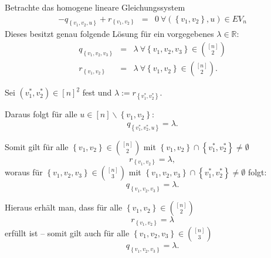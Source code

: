 \documentclass[10p,a4paper,BCOR = 12mm, DIV=15]{scrbook}
\begin{document}
\begin{Le}
\label{le:loesung_transponiert_nsymmxy}
Betrachte das homogene lineare Gleichungssystem
\begin{eqnarray*}
-q_{\left\{v_1, v_2, u\right\}} + r_{\left\{v_1, v_2\right\}} & = &  0\ \forall \left(\left\{v_1, v_2\right\}, u\right)\in EV_n
\end{eqnarray*}
Dieses besitzt genau folgende Lösung für ein vorgegebenes $\lambda\in \mathbb{R}$:
\begin{eqnarray*}
q_{\left\{v_1, v_2, v_3\right\}} & = & \lambda \ \forall \left\{v_1, v_2, v_3\right\} \in {\left[n\right] \choose 2} \\
r_{\left\{v_1, v_2\right\}} & = & \lambda \ \forall \left\{v_1, v_2\right\}\in {\left[n\right] \choose 2}.
\end{eqnarray*}
\end{Le}
\begin{bew}
Sei $\left(v_1^*, v_2^*\right) \in \left[n\right]^{\underline{2}}$ fest und $\lambda := r_{\left\{v_1^*, v_2^*\right\}}$.

Daraus folgt für alle $u \in \left[n\right] \backslash \left\{v_1, v_2\right\}$:
\begin{displaymath}
q_{\left\{v_1^*, v_2^*, u\right\}} = \lambda.
\end{displaymath}

Somit gilt für alle $\left\{v_1, v_2\right\} \in {\left[n\right] \choose 2}$ mit $\left\{v_1, v_2\right\} \cap \left\{v_1^*, v_2^*\right\} \neq \emptyset$
\begin{displaymath}
r_{\left\{v_1, v_2\right\}} = \lambda,
\end{displaymath}
woraus für $\left\{v_1, v_2, v_3\right\} \in {\left[n\right] \choose 3}$ mit $\left\{v_1, v_2, v_3\right\} \cap \left\{v_1^*, v_2^*\right\} \neq \emptyset$ folgt:
\begin{displaymath}
q_{\left\{v_1, v_2, v_3\right\}} = \lambda.
\end{displaymath}

Hieraus erhält man, dass für alle $\left\{v_1, v_2\right\} \in {\left[n\right] \choose 2}$
\begin{displaymath}
r_{\left\{v_1, v_2\right\}} = \lambda
\end{displaymath}
erfüllt ist -- somit gilt auch für alle $\left\{v_1, v_2, v_3\right\} \in {\left[n\right] \choose 3}$
\begin{displaymath}
q_{\left\{v_1, v_2, v_3\right\}} = \lambda.
\end{displaymath}
\end{bew}
\end{document}
